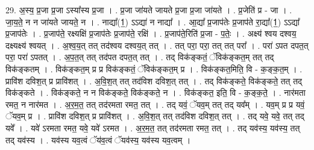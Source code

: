\documentclass[17pt]{extarticle}
\begin{document}
29. अ॒स्य॒ प्र॒जा प्र॒जा ऽस्या᳚स्य प्र॒जा । . प्र॒जा जा॑यते जायते प्र॒जा प्र॒जा जा॑यते । . प्र॒जेति॑ प्र - जा । . जा॒य॒ते॒ न न जा॑यते जायते॒ न । . नाद्या᳚(1॒) ऽऽद्या॑ न नाद्या᳚ । . आ॒द्या᳚ प्र॒जाप॑तेः प्र॒जाप॑ते रा॒द्या᳚(1॒) ऽऽद्या᳚ प्र॒जाप॑तेः । . प्र॒जाप॑ते॒ रक्ष्यक्षि॑ प्र॒जाप॑तेः प्र॒जाप॑ते॒ रक्षि॑ । . प्र॒जाप॑ते॒रिति॑ प्र॒जा - प॒तेः॒ । . अक्ष्य॑ श्वय दश्वय॒ दक्ष्यक्ष्य॑ श्वयत् । . अ॒श्व॒य॒त् तत् तद॑श्वय दश्वय॒त् तत् । . तत् परा॒ परा॒ तत् तत् परा᳚ । . परा॑ ऽपत दपत॒त् परा॒ परा॑ ऽपतत् । . अ॒प॒त॒त् तत् तद॑पत दपत॒त् तत् । . तद् विक॑ङ्कतं॒ ॅविक॑ङ्कत॒म् तत् तद् विक॑ङ्कतम् । . विक॑ङ्कत॒म् प्र प्र विक॑ङ्कतं॒ ॅविक॑ङ्कत॒म् प्र । . विक॑ङ्कत॒मिति॒ वि - क॒ङ्क॒त॒म् । . प्रावि॑श दविश॒त् प्र प्रावि॑शत् । . अ॒वि॒श॒त् तत् तद॑विश दविश॒त् तत् । . तद् विक॑ङ्कते॒ विक॑ङ्कते॒ तत् तद् विक॑ङ्कते । . विक॑ङ्कते॒ न न विक॑ङ्कते॒ विक॑ङ्कते॒ न । . विक॑ङ्कत॒ इति॒ वि - क॒ङ्क॒ते॒ । . नार॑मता रमत॒ न नार॑मत । . अ॒र॒म॒त॒ तत् तद॑रमता रमत॒ तत् । . तद् यवं॒ ॅयव॒म् तत् तद् यव᳚म् । . यव॒म् प्र प्र यवं॒ ॅयव॒म् प्र । . प्रावि॑श दविश॒त् प्र प्रावि॑शत् । . अ॒वि॒श॒त् तत् तद॑विश दविश॒त् तत् । . तद् यवे॒ यवे॒ तत् तद् यवे᳚ । . यवे॑ ऽरमता रमत॒ यवे॒ यवे॑ ऽरमत । . अ॒र॒म॒त॒ तत् तद॑रमता रमत॒ तत् । . तद् यव॑स्य॒ यव॑स्य॒ तत् तद् यव॑स्य । . यव॑स्य यव॒त्वं ॅय॑व॒त्वं ॅयव॑स्य॒ यव॑स्य यव॒त्वम् । \newline
\end{document}
